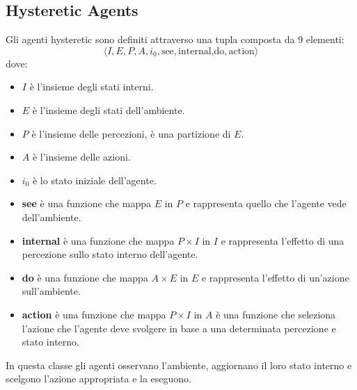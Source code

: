 \subsection{Hysteretic Agents}
Gli agenti hysteretic sono definiti attraverso una tupla composta da 9 elementi:
\begin{equation*}
    \langle I, E, P, A, i_0, \text{see}, \text{internal,} \text{do}, \text{action} \rangle
\end{equation*}
dove:
\begin{itemize}
    \item $I$ è l'insieme degli stati interni.
    \item $E$ è l'insieme degli stati dell'ambiente.
    \item $P$ è l'insieme delle percezioni, è una partizione di $E$.
    \item $A$ è l'insieme delle azioni.
    \item $i_0$ è lo stato iniziale dell'agente.
    \item \textbf{see} è una funzione che mappa $E$ in $P$ e rappresenta quello
          che l'agente vede dell'ambiente.
    \item \textbf{internal} è una funzione che mappa $P \times I$ in $I$ e
          rappresenta l'effetto di una percezione sullo stato interno dell'agente.
    \item \textbf{do} è una funzione che mappa $A \times E$ in $E$ e rappresenta
          l'effetto di un'azione sull'ambiente.
    \item \textbf{action} è una funzione che mappa $P \times I$ in $A$ è una funzione
          che seleziona l'azione che l'agente deve svolgere in base a una determinata
          percezione e stato interno.
\end{itemize}
In questa classe gli agenti osservano l'ambiente, aggiornano il loro stato interno
e scelgono l'azione appropriata e la eseguono.
